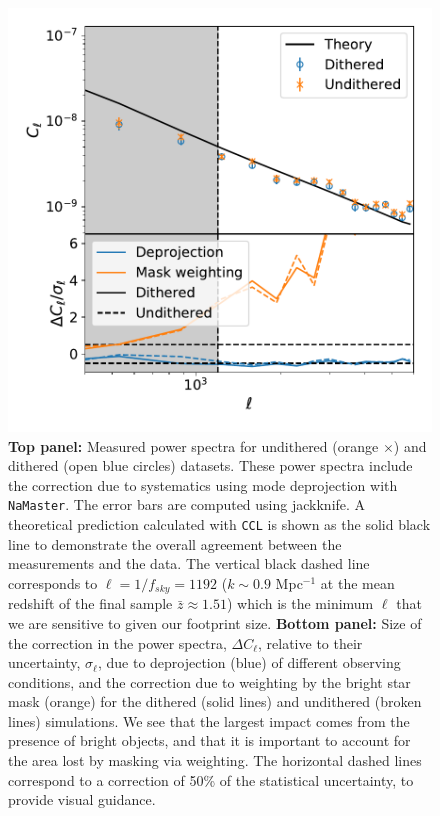 \documentclass[a4paper,fleqn,usenatbib]{mnras}
\begin{document}
\begin{figure}
\centering
\includegraphics[width=0.9\columnwidth]{Cl_results_2019_comp}
\caption{{\bf Top panel:} Measured power spectra for undithered (orange $\times$) and dithered (open blue circles) datasets. These power spectra include the correction due to systematics using mode deprojection with \texttt{NaMaster}. The error bars are computed using jackknife. A theoretical prediction calculated with \texttt{CCL} is shown as the solid black line to demonstrate the overall agreement between the measurements and the data. The vertical black dashed line corresponds to $\ell = 1/f_{sky}=1192$ ($k \sim 0.9$ Mpc$^{-1}$ at the mean redshift of the final sample $\bar{z} \approx 1.51$) which is the minimum $\ell$ that we are sensitive to given our footprint size. {\bf Bottom panel:} Size of the correction in the power spectra, $\Delta C_{\ell}$, relative to their uncertainty, $\sigma_{\ell}$, due to deprojection (blue) of different observing conditions, and the correction due to weighting by the bright star mask (orange) for the dithered (solid lines) and undithered (broken lines) simulations. We see that the largest impact comes from the presence of bright objects, and that it is important to account for the area lost by masking via weighting. The horizontal dashed lines correspond to a correction of 50\% of the statistical uncertainty, to provide visual guidance.} 
\label{fig:power_spectra}
\end{figure}
\end{document}
